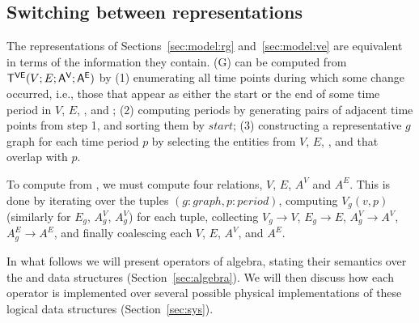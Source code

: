 \subsection{Switching between representations}  
\label{sec:model:switch}

The representations of Sections~\ref{sec:model:rg}
and~\ref{sec:model:ve} are equivalent in terms of the information they
contain.  \trg (G) can be computed from $\mathsf{T^{VE}} (V; E; \mathsf{A^{V}}; \mathsf{A^{E}})$ by
(1) enumerating all time points during which some change occurred,
i.e., those that appear as either the start or the end of some time
period in $V$, $E$, \tav, and \tae; (2) computing \rgs periods by
generating pairs of adjacent time points from step 1, and sorting them
by $start$; (3) constructing a representative $g$ graph for each time
period $p$ by selecting the entities from $V$, $E$, \tav, and \tae
that overlap with $p$.

To compute \ve from \rgs, we must compute four relations, $V$, $E$,
$A^{V}$ and $A^{E}$.  This is done by iterating over the tuples
$(g:graph,p:period)$, computing $V_g(v,p)$ (similarly for $E_g$,
$A^{V}_g$, $A^{V}_g$) for each tuple, collecting $V_g \rightarrow V$,
$E_g \rightarrow E$, $A^{V}_g \rightarrow A^{V}$, $A^{E}_g \rightarrow
A^{E}$, and finally coalescing each $V$, $E$, $A^{V}$, and $A^{E}$.

In what follows we will present operators of \tg algebra, stating
their semantics over the \rgs and \ve data structures
(Section~\ref{sec:algebra}).  We will then discuss how each operator
is implemented over several possible physical implementations of these
logical data structures (Section~\ref{sec:sys}).


